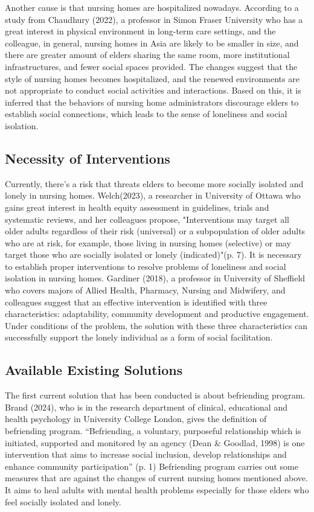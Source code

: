 \documentclass[12pt]{article}
\begin{document}
Another cause is that nursing homes are hospitalized nowadays. According to a study from Chaudhury (2022), a professor in Simon Fraser University who has a great interest in physical environment in long-term care settings, and the colleague, in general, nursing homes in Asia are likely to be smaller in size, and there are greater amount of elders sharing the same room, more institutional infrastructures, and fewer social spaces provided. The changes suggest that the style of nursing homes becomes hospitalized, and the renewed environments are not appropriate to conduct social activities and interactions. Based on this, it is inferred that the behaviors of nursing home administrators discourage elders to establish social connections, which leads to the sense of loneliness and social isolation. 


\subsection{Necessity of Interventions}

Currently, there’s a risk that threats elders to become more socially isolated and lonely in nursing homes. Welch(2023), a researcher in University of Ottawa who gains great interest in health equity assessment in guidelines, trials and systematic reviews, and her colleagues propose, "Interventions may target all older adults regardless of their risk (universal) or a subpopulation of older adults who are at risk, for example, those living in nursing homes (selective) or may target those who are socially isolated or lonely (indicated)"(p. 7). It is necessary to establish proper interventions to resolve problems of loneliness and social isolation in nursing homes. Gardiner (2018), a professor in University of Sheffield who covers majors of Allied Health, Pharmacy, Nursing and Midwifery, and colleagues suggest that an effective intervention is identified with three characteristics: adaptability, community development and productive engagement. Under conditions of the problem, the solution with these three characteristics can successfully support the lonely individual as a form of social facilitation.


\subsection{Available Existing Solutions}

The first current solution that has been conducted is about befriending program. Brand (2024), who is in the research department of clinical, educational and health psychology in University College London, gives the definition of befriending program. “Befriending, a voluntary, purposeful relationship which is initiated, supported and monitored by an agency (Dean \& Goodlad, 1998) is one intervention that aims to increase social inclusion, develop relationships and enhance community participation” (p. 1) Befriending program carries out some measures that are against the changes of current nursing homes mentioned above. It aims to heal adults with mental health problems especially for those elders who feel socially isolated and lonely.
\end{document}

